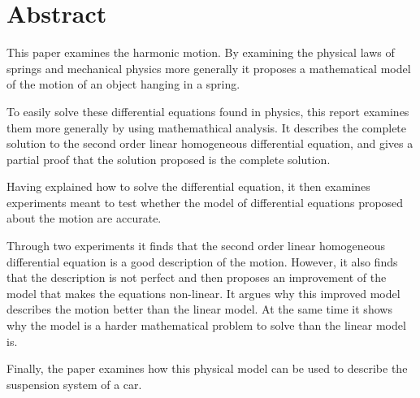 \section*{Abstract}
\thispagestyle{plain}

This paper examines the harmonic motion. 
By examining the physical laws of springs and mechanical physics more generally it proposes a mathematical model of the motion of an object hanging in a spring.

To easily solve these differential equations found in physics, this report examines them more generally by using mathemathical analysis. 
It describes the complete solution to the second order linear homogeneous differential equation, and gives a partial proof that the solution proposed is the complete solution. 

Having explained how to solve the differential equation, it then examines experiments meant to test whether the model of differential equations proposed about the motion are accurate.

Through two experiments it finds that the second order linear homogeneous differential equation is a good description of the motion.
However, it also finds that the description is not perfect and then proposes an improvement of the model that makes the equations non-linear.
It argues why this improved model describes the motion better than the linear model.
At the same time it shows why the model is a harder mathematical problem to solve than the linear model is. 

Finally, the paper examines how this physical model can be used to describe the suspension system of a car.


